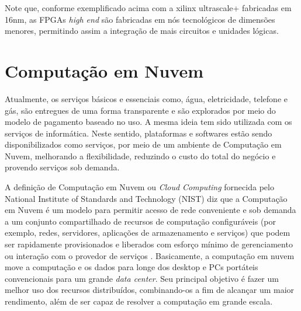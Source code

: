 Note que, conforme exemplificado acima com a xilinx ultrascale+ fabricadas em 16nm, as FPGAs \textit{high end} são fabricadas em nós tecnológicos de dimensões menores, permitindo assim a integração de mais circuitos e unidades lógicas.  
 
 


\section{Computação em Nuvem}

Atualmente, os serviços básicos e essenciais como, água, eletricidade, telefone e gás, são entregues de uma forma transparente e são explorados por meio do modelo de pagamento baseado no uso. A mesma ideia tem sido utilizada com os serviços de informática. Neste sentido, plataformas e softwares estão sendo disponibilizados como serviços, por meio de um ambiente de Computação em Nuvem, melhorando a flexibilidade, reduzindo o custo do total do negócio e provendo serviços sob demanda.


A definição de Computação em Nuvem ou \textit{Cloud Computing} fornecida pelo National Institute of Standards and
Technology (NIST) diz que a Computação em Nuvem é um modelo para permitir acesso de rede conveniente e sob demanda a um conjunto compartilhado de recursos de computação configuráveis (por exemplo, redes, servidores, aplicações de armazenamento  e serviços) que podem ser rapidamente provisionados e liberados com esforço mínimo de gerenciamento ou interação com o provedor de serviços \cite{6203873}. Basicamente, a computação em nuvem move a computação e os dados para longe dos desktop e PCs portáteis convencionais para um grande \textit{data center}. Seu principal objetivo é fazer um melhor uso dos recursos distribuídos, combinando-os a fim de alcançar um maior rendimento, além de ser capaz de resolver a computação em grande escala.


